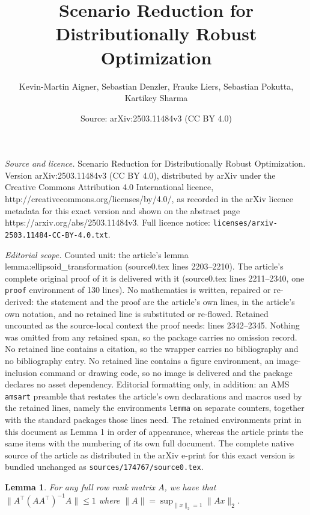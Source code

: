 \documentclass[10pt,a4paper]{amsart}
\title{Scenario Reduction for Distributionally Robust Optimization}
\author{Kevin-Martin Aigner, Sebastian Denzler, Frauke Liers, Sebastian Pokutta, Kartikey Sharma}
\date{Source: arXiv:2503.11484v3 (CC BY 4.0)}
\newtheorem{lemma}{Lemma}
\begin{document}
\maketitle

\noindent\emph{Source and licence.} Scenario Reduction for Distributionally Robust Optimization. Version arXiv:2503.11484v3 (CC BY 4.0), distributed by arXiv under the Creative Commons Attribution 4.0 International licence, http://creativecommons.org/licenses/by/4.0/, as recorded in the arXiv licence metadata for this exact version and shown on the abstract page https://arxiv.org/abs/2503.11484v3. Full licence notice: \texttt{licenses/arxiv-2503.11484-CC-BY-4.0.txt}.\par\smallskip

\noindent\textit{Editorial scope.} Counted unit: the article's lemma lemma:ellipsoid\_transformation (source0.tex lines 2203--2210). The article's complete original proof of it is delivered with it (source0.tex lines 2211--2340, one \texttt{proof} environment of 130 lines). No mathematics is written, repaired or re-derived: the statement and the proof are the article's own lines, in the article's own notation, and no retained line is substituted or re-flowed.  Retained uncounted as the source-local context the proof needs: lines 2342--2345.  Nothing was omitted from any retained span, so the package carries no omission record.  No retained line contains a citation, so the wrapper carries no bibliography and no bibliography entry.  No retained line contains a figure environment, an image-inclusion command or drawing code, so no image is delivered and the package declares no asset dependency.  Editorial formatting only, in addition: an AMS \texttt{amsart} preamble that restates the article's own declarations and macros used by the retained lines, namely the environments \texttt{lemma} on separate counters, together with the standard packages those lines need.  The retained environments print in this document as Lemma 1 in order of appearance, whereas the article prints the same items with the numbering of its own full document.  The complete native source of the article as distributed in the arXiv e-print for this exact version is bundled unchanged as \texttt{sources/174767/source0.tex}.
\begin{lemma}
	\label{lemma:norm_bound}
	For any full row rank matrix \(A\), we have that \(\|A^{\top}(A A^{\top})^{-1}A\| \leq 1\) where \(\|A\| = \sup_{\|x\|_2 = 1} \|A x\|_2\). 
\end{lemma}
\end{document}
